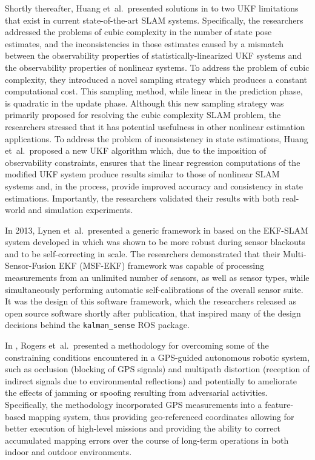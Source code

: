 Shortly thereafter, Huang et~al.\ presented solutions in \cite{Huang2013} to two UKF limitations that exist in current state-of-the-art SLAM systems. Specifically, the researchers addressed the problems of cubic complexity in the number of state pose estimates, and the inconsistencies in those estimates caused by a mismatch between the observability properties of statistically-linearized UKF systems and the observability properties of nonlinear systems. To address the problem of cubic complexity, they introduced a novel sampling strategy which produces a constant computational cost. This sampling method, while linear in the prediction phase, is quadratic in the update phase. Although this new sampling strategy was primarily proposed for resolving the cubic complexity SLAM problem, the researchers stressed that it has potential usefulness in other nonlinear estimation applications. To address the problem of inconsistency in state estimations, Huang et~al.\ proposed a new UKF algorithm which, due to the imposition of observability constraints, ensures that the linear regression computations of the modified UKF system produce results similar to those of nonlinear SLAM systems and, in the process, provide improved accuracy and consistency in state estimations. Importantly, the researchers validated their results with both real-world and simulation experiments.

In 2013, Lynen et~al.\ presented a generic framework in \cite{Lynen2013} based on the EKF-SLAM system developed in \cite{Weiss2012} which was shown to be more robust during sensor blackouts and to be self-correcting in scale. The researchers demonstrated that their Multi-Sensor-Fusion EKF (MSF-EKF) framework was capable of processing measurements from an unlimited number of sensors, as well as sensor types, while simultaneously performing automatic self-calibrations of the overall sensor suite. It was the design of this software framework, which the researchers released as open source software shortly after publication, that inspired many of the design decisions behind the \texttt{kalman\_sense} ROS package.

In \cite{Rogers2014}, Rogers et~al.\ presented a methodology for overcoming some of the constraining conditions encountered in a GPS-guided autonomous robotic system, such as occlusion (blocking of GPS signals) and multipath distortion (reception of indirect signals due to environmental reflections) and potentially to ameliorate the effects of jamming or spoofing resulting from adversarial activities. Specifically, the methodology incorporated GPS measurements into a feature-based mapping system, thus providing geo-referenced coordinates allowing for better execution of high-level missions and providing the ability to correct accumulated mapping errors over the course of long-term operations in both indoor and outdoor environments.

